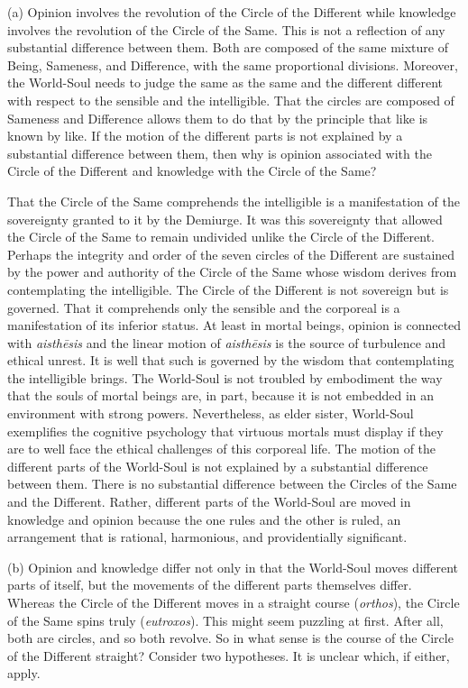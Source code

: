 (a) Opinion involves the revolution of the Circle of the Different while knowledge involves the revolution of the Circle of the Same. This is not a reflection of any substantial difference between them. Both are composed of the same mixture of Being, Sameness, and Difference, with the same proportional divisions. Moreover, the World-Soul needs to judge the same as the same and the different different with respect to the sensible and the intelligible. That the circles are composed of Sameness and Difference allows them to do that by the principle that like is known by like. If the motion of the different parts is not explained by a substantial difference between them, then why is opinion associated with the Circle of the Different and knowledge with the Circle of the Same?

That the Circle of the Same comprehends the intelligible is a manifestation of the sovereignty granted to it by the Demiurge. It was this sovereignty that allowed the Circle of the Same to remain undivided unlike the Circle of the Different. Perhaps the integrity and order of the seven circles of the Different are sustained by the power and authority of the Circle of the Same whose wisdom derives from contemplating the intelligible. The Circle of the Different is not sovereign but is governed. That it comprehends only the sensible and the corporeal is a manifestation of its inferior status. At least in mortal beings, opinion is connected with \emph{aisthēsis} and the linear motion of \emph{aisthēsis} is the source of turbulence and ethical unrest. It is well that such is governed by the wisdom that contemplating the intelligible brings. The World-Soul is not troubled by embodiment the way that the souls of mortal beings are, in part, because it is not embedded in an environment with strong powers. Nevertheless, as elder sister, World-Soul exemplifies the cognitive psychology that virtuous mortals must display if they are to well face the ethical challenges of this corporeal life. The motion of the different parts of the World-Soul is not explained by a substantial difference between them. There is no substantial difference between the Circles of the Same and the Different. Rather, different parts of the World-Soul are moved in knowledge and opinion because the one rules and the other is ruled, an arrangement that is rational, harmonious, and providentially significant.

(b) Opinion and knowledge differ not only in that the World-Soul moves different parts of itself, but the movements of the different parts themselves differ. Whereas the Circle of the Different moves in a straight course (\emph{orthos}), the Circle of the Same spins truly (\emph{eutroxos}). This might seem puzzling at first. After all, both are circles, and so both revolve. So in what sense is the course of the Circle of the Different straight? Consider two hypotheses. It is unclear which, if either, apply.

